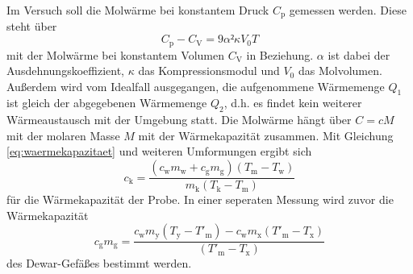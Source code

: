 Im Versuch soll die Molwärme bei konstantem Druck $C_\mathup{p}$ gemessen werden. 
Diese steht über
\begin{equation}
	C_\mathup{p}-C_\mathup{V}=9{\alpha}²\kappa V_0 T
	\label{alphakappalpha}
\end{equation}
mit der Molwärme bei konstantem Volumen $C_\mathup{V}$ in Beziehung. 
$\alpha$ ist dabei der Ausdehnungskoeffizient, $\kappa$ das Kompressionsmodul und $V_0$ das Molvolumen.
Außerdem wird vom Idealfall ausgegangen, die aufgenommene Wärmemenge $Q_1$ ist gleich der abgegebenen Wärmemenge $Q_2$, d.h. 
es findet kein weiterer Wärmeaustausch mit der Umgebung statt.
Die Molwärme hängt über $C=cM$ mit der molaren Masse $M$ mit der Wärmekapazität zusammen.
Mit Gleichung \eqref{eq:waermekapazitaet} und weiteren Umformungen ergibt sich
\begin{equation}
	c_\mathup{k}=\frac{(c_\mathup{w}m_\mathup{w}+c_\mathup{g}m_\mathup{g})(T_\mathup{m}-T_\mathup{w})}{m_\mathup{k}(T_\mathup{k}-T_\mathup{m})}
	\label{c_Probe}
\end{equation}
für die Wärmekapazität der Probe. 
In einer seperaten Messung wird zuvor die Wärmekapazität 
\begin{equation}
	c_\mathup{g}m_\mathup{g}=\frac{c_\mathup{w}m_\mathup{y}(T_\mathup{y}-T'_\mathup{m})-c_\mathup{w}m_\mathup{x}(T'_\mathup{m}-T_\mathup{x})}{(T'_\mathup{m}-T_\mathup{x})}
	\label{c_Dewar}
\end{equation}
des Dewar-Gefäßes bestimmt werden. 


